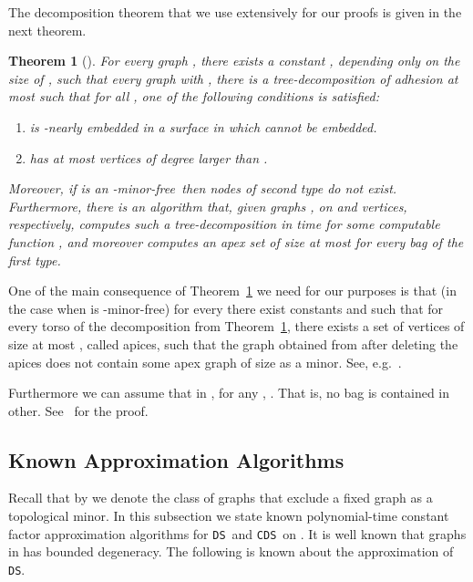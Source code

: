 \documentclass[11pt]{article}
\newtheorem{theorem}{Theorem}
\newcommand{\Hmf}{-minor-free}
\newcommand{\tDS}{{\texttt{\sc DS}}}
\newcommand{\tCDS}{{\texttt{\sc CDS}}}
\begin{document}
\noindent
The decomposition theorem that we use extensively for our proofs is given in the next theorem. 
\begin{theorem}  [\cite{abs-1209-0129,GroheM12,RobertsonS03}]
\label{thm:structure theorem}  
For every graph , there exists a constant , 
depending only on the size of , such that every graph   with , there is a tree-decomposition 
 of adhesion at most  such that for all , one of the following conditions is satisfied: 
\begin{enumerate}
\item    is -nearly embedded in a surface  in which  cannot be embedded.
\item  has at most  vertices of degree larger than .
\end{enumerate}
Moreover, if  is an \Hmf \,   then nodes of second type do not exist. 
\noindent
Furthermore, there is an algorithm that, given graphs ,  on  and  vertices, respectively, computes such a tree-decomposition in time 
 for some computable function ,  and moreover computes an apex set  of size at most   
for every bag of the first type.
\end{theorem}
One of the main consequence of Theorem~\ref{thm:structure theorem} we need for our purposes is  that (in the case when 
 is \Hmf) for every 
 there exist  constants  and  such that  for every torso   of the decomposition from 
Theorem~\ref{thm:structure theorem}, there exists a set of vertices  of size at most , called apices, such 
that the graph obtained from  after deleting the apices does not contain some  apex graph  of size 
 as a minor. See, e.g.~\cite[Theorem ]{Grohe03}. 

 Furthermore we can assume that in  , for any , . That is, no bag is contained in other. 
 See~\cite[Lemma 11.9]{FlumGrohebook} for the proof.  
 






  



\subsection{Known Approximation Algorithms}
Recall that by  we denote the class of graphs that exclude a fixed graph  as a topological minor. 
In this subsection we state known polynomial-time constant factor approximation algorithms  for \tDS \, and \tCDS\ on . It is well known that graphs in 
 has bounded 
degeneracy. The following is known about the approximation of \tDS. 
\end{document}
